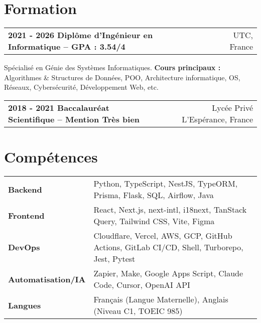 \documentclass[a4paper,10pt]{article}
\makeatletter
\newenvironment{jobshort}[2]
    {
    \begin{tabularx}{\linewidth}{@{}l X r@{}}
    \textbf{#1} & \hfill &  #2 \\[2pt]
    \end{tabularx}
    } {}
\makeatother
\begin{document}
\section{Formation}

\begin{jobshort}{2021 - 2026    Diplôme d'Ingénieur en Informatique – GPA : 3.54/4}{UTC, France}
    Spécialisé en Génie des Systèmes Informatiques. \textbf{Cours principaux :} Algorithmes \& Structures de Données, POO, Architecture informatique, OS, Réseaux, Cybersécurité, Développement Web, etc.
\end{jobshort}

\begin{jobshort}{2018 - 2021    Baccalauréat Scientifique – Mention Très bien}{Lycée Privé L'Espérance, France}
\end{jobshort}

\section{Compétences}

\begin{tabularx}{\linewidth}{@{}l X@{}}
    \textbf{Backend}           & \normalsize{Python, TypeScript, NestJS, TypeORM, Prisma, Flask, SQL, Airflow, Java}                     \\
    \textbf{Frontend}          & \normalsize{React, Next.js, next-intl, i18next, TanStack Query, Tailwind CSS, Vite, Figma}              \\
    \textbf{DevOps}            & \normalsize{Cloudflare, Vercel, AWS, GCP, GitHub Actions, GitLab CI/CD, Shell, Turborepo, Jest, Pytest} \\
    \textbf{Automatisation/IA} & \normalsize{Zapier, Make, Google Apps Script, Claude Code, Cursor, OpenAI API}                          \\
    \textbf{Langues}           & \normalsize{Français (Langue Maternelle), Anglais (Niveau C1, TOEIC 985)}                               \\
\end{tabularx}
\end{document}

